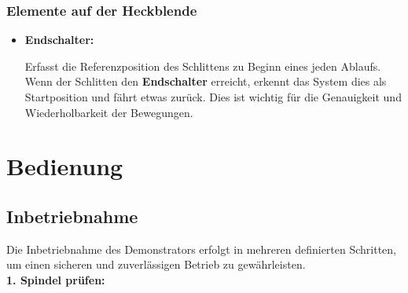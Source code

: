 \documentclass[a4paper,12pt]{report}
\begin{document}
	\subsection{Elemente auf der Heckblende}
	\begin{itemize}[leftmargin=1.5em]
		
		\item \textbf{Endschalter:}
		
		Erfasst die Referenzposition des Schlittens zu Beginn eines jeden Ablaufs. Wenn der Schlitten den \textbf{Endschalter} erreicht, erkennt das System dies als Startposition und fährt etwas zurück. Dies ist wichtig für die Genauigkeit und Wiederholbarkeit der Bewegungen.\\
		
	\end{itemize}
	
	
	\chapter{Bedienung}
	\section{Inbetriebnahme}

		Die Inbetriebnahme des Demonstrators erfolgt in mehreren definierten Schritten, um einen sicheren und zuverlässigen Betrieb zu gewährleisten. \\[0,75cm]
		
		\noindent\textbf{1. Spindel prüfen:}
		
\end{document}
